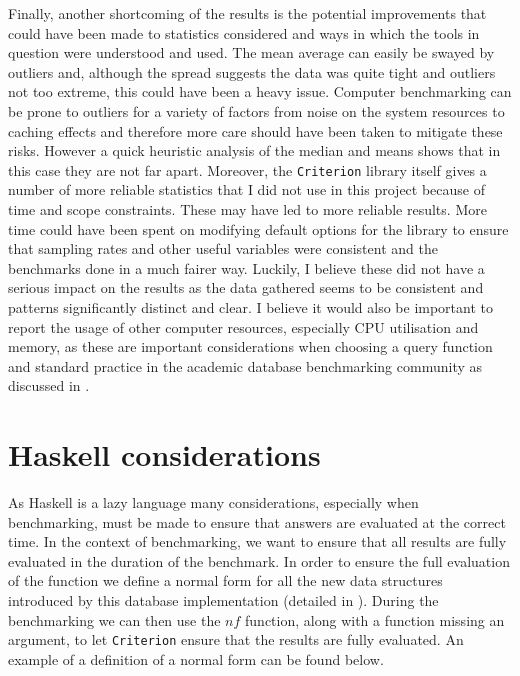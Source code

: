 Finally, another shortcoming of the results is the potential improvements that
could have been made to statistics considered and ways in which the tools in
question were understood and used. The mean average can easily be swayed by
outliers and, although the spread suggests the data was quite tight and
outliers not too extreme, this could have been a heavy issue. Computer
benchmarking can be prone to outliers for a variety of factors from noise on the
system resources to caching effects and therefore more care should have been
taken to mitigate these risks. However a quick heuristic analysis of the median
and means shows that in this case they are not far apart. Moreover, the
\verb|Criterion| library itself gives a number of more reliable statistics that
I did not use in this project because of time and scope constraints. These may
have led to more reliable results. More time could have been spent on modifying
default options for the library to ensure that sampling rates and other useful
variables were consistent and the benchmarks done in a much fairer way. Luckily,
I believe these did not have a serious impact on the results as the data
gathered seems to be consistent and patterns significantly distinct and clear. I
believe it would also be important to report the usage of other computer
resources, especially CPU utilisation and memory, as these are important
considerations when choosing a query function and standard practice in the academic
database benchmarking community as discussed in
.

\section{Haskell considerations}
As Haskell is a lazy language many considerations, especially when benchmarking,
must be made to ensure that answers are evaluated at the correct time. In the
context of benchmarking, we want to ensure that all results are fully evaluated
in the duration of the benchmark. In order to ensure the full evaluation of the
function we define a normal form for all the new data structures introduced by
this database implementation (detailed in ). During the
benchmarking we can then use the $nf$ function, along with a function missing an
argument, to let \verb|Criterion| ensure that the results are fully evaluated.
An example of a definition of a normal form can be found below.




